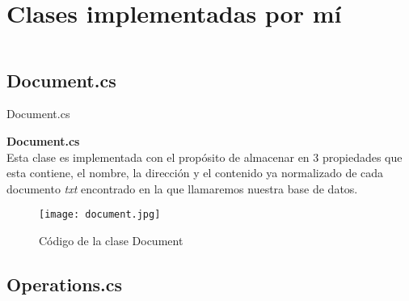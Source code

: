 \section{Clases implementadas por mí}\label{CreateClass}


\begin{frame}
    \begin{columns}[t]
        \begin{column}{.5\textwidth}
          \tableofcontents[sections={1-2},currentsection]
        \end{column}
        \begin{column}{.5\textwidth}
          \tableofcontents[sections={3-4},currentsection]
        \end{column}
    \end{columns}
\end{frame}

\subsection{Document.cs}

\begin{frame}[fragile]{Document.cs}
  
  \textbf{Document.cs}\\
  Esta clase es implementada con el propósito de almacenar en 3 propiedades que esta contiene, el nombre, 
  la dirección y el contenido ya normalizado de cada documento \emph{txt} encontrado en la que llamaremos nuestra 
  base de datos.

 \begin{figure}[h]
    \center
    \texttt{[image: document.jpg]}
    \caption{Código de la clase Document}
 \end{figure}

\end{frame}

\subsection{Operations.cs}

